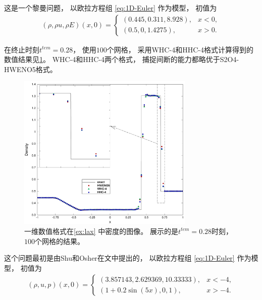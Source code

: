 

\begin{example}[一维欧拉方程组的Lax激波管问题]
  \label{ex:lax}
  这是一个黎曼问题，
  以欧拉方程组 \cref{eq:1D-Euler} 作为模型，
  初值为
  \begin{equation}
    \begin{aligned}
      (\rho,\rho u,\rho E)(x,0)=
      \begin{cases}
        (0.445,0.311,8.928), & x<0,  \\
        (0.5,0,1.4275),      & x>0.
      \end{cases}
    \end{aligned}
  \end{equation}
\end{example}

在终止时刻$t^{tem}=0.28$，
使用$100$个网格，
采用WHC-4和HHC-4格式计算得到的数值结果见\cref{fig:2_1}。
WHC-4和HHC-4两个格式，
捕捉间断的能力都略优于S2O4-HWENO5格式。

\begin{figure}[htbp]
  \centering
  \includegraphics[width=0.75\textwidth]{fig/1D/Ex2.pdf}
  \caption{一维数值格式在\cref{ex:lax} 中密度的图像。
    展示的是$t^{tem} = 0.28$时刻，
    $100$个网格的结果。
  }
  \label{fig:2_1}
\end{figure}

\begin{example}
  \label{ex:osher}
  这个问题最初是由Shu和Osher在文\cite{ShuOsherProblem}中提出的，
  以欧拉方程组 \cref{eq:1D-Euler} 作为模型，
  初值为
  \begin{equation}
    \begin{aligned}
      (\rho,u,p)(x,0)=
      \begin{cases}
        (3.857143,2.629369,10.33333), & x<-4,  \\
        (1 + 0.2\sin(5 x),0,1),       & x>-4.
      \end{cases}
    \end{aligned}
  \end{equation}
\end{example}


